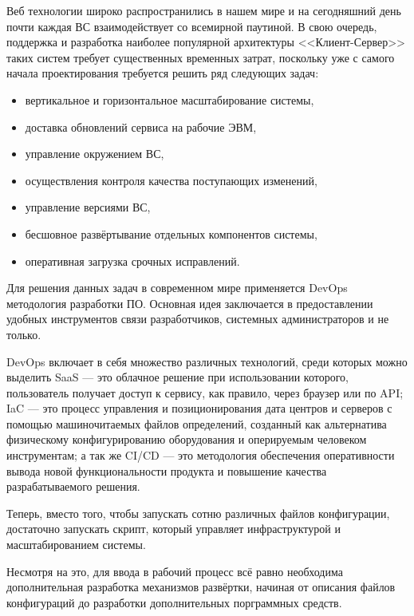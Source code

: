 \Introduction

Веб технологии широко распространились в нашем мире и на сегодняшний день почти каждая ВС взаимодействует со всемирной паутиной.
В свою очередь, поддержка и разработка наиболее популярной архитектуры <<Клиент-Сервер>> таких систем требует существенных временных затрат, поскольку уже с самого начала проектирования требуется решить ряд следующих задач:

\begin{itemize}
    \item вертикальное и горизонтальное масштабирование системы,
    \item доставка обновлений сервиса на рабочие ЭВМ,
    \item управление окружением ВС,
    \item осуществления контроля качества поступающих изменений,
    \item управление версиями ВС,
    \item бесшовное развёртывание отдельных компонентов системы,
    \item оперативная загрузка срочных исправлений.
\end{itemize}

Для решения данных задач в современном мире применяется DevOps методология разработки ПО\cite{projectPhoenix}.
Основная идея заключается в предоставлении удобных инструментов связи разработчиков, системных администраторов и не только.

DevOps включает в себя множество различных технологий, среди которых можно выделить
SaaS --- это облачное решение при использовании \cite{cd}
которого, пользователь получает доступ к сервису, как правило, через браузер или по API;
IaC --- это процесс управления и позиционирования дата центров и серверов с помощью машиночитаемых файлов определений,
созданный как альтернатива физическому конфигурированию оборудования и оперируемым человеком инструментам;
а так же CI/CD --- это методология обеспечения оперативности вывода новой функциональности продукта и повышение качества разрабатываемого решения\cite{ciCd}.

Теперь, вместо того, чтобы запускать сотню различных файлов конфигурации,
достаточно запускать скрипт, который управляет инфраструктурой и масштабированием системы.

Несмотря на это, для ввода в рабочий процесс всё равно необходима дополнительная разработка механизмов развёртки,
начиная от описания файлов конфигураций до разработки дополнительных порграммных средств.

